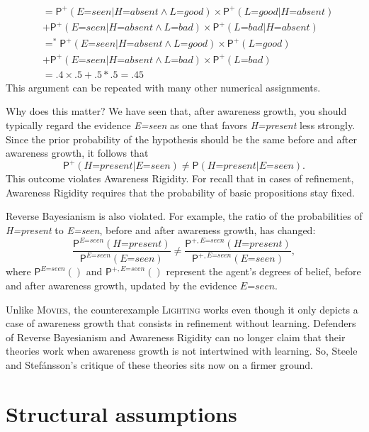 \documentclass[
  11pt,
  dvipsnames,enabledeprecatedfontcommands]{scrartcl}
\newcommand{\pr}[1]{\ensuremath{\mathsf{P}(#1)}}
\newcommand{\ppr}[2]{\ensuremath{\mathsf{P}^{#1}(#2)}}
\begin{document}
{\begin{align*}
  &= \ppr{+}{\textit{E=seen} \vert \textit{H=absent} \wedge \textit{L=good}}  \times \ppr{+}{\textit{L=good} \vert  \textit{H=absent} }\\ & +\ppr{+}{\textit{E=seen}  \vert \textit{H=absent} \wedge \textit{L=bad}} \times \ppr{+}{\textit{L=bad} \vert  \textit{H=absent}}\\
  &=^* \ppr{+}{\textit{E=seen} \vert \textit{H=absent} \wedge \textit{L=good}}  \times \ppr{+}{\textit{L=good}}\\ & +\ppr{+}{\textit{E=seen}  \vert \textit{H=absent} \wedge \textit{L=bad}} \times \ppr{+}{\textit{L=bad}}\\
  &= .4 \times .5 +.5 *.5 = .45 
  \end{align*} This argument can be repeated with many other numerical
  assignments.}

Why does this matter? We have seen that, after awareness growth, you
should typically regard the evidence \textit{E=seen} as one that favors
\textit{H=present} less strongly. Since the prior probability of the
hypothesis should be the same before and after awareness growth, it
follows that
\[\ppr{+}{\textit{H=present} \vert \textit{E=seen}} \neq \pr{\textit{H=present} \vert \textit{E=seen}}.\]
This outcome violates Awareness Rigidity. For recall that in cases of
refinement, Awareness Rigidity requires that the probability of basic
propositions stay fixed.

Reverse Bayesianism is also violated. For example, the ratio of the
probabilities of \textit{H=present} to \textit{E=seen}, before and after
awareness growth, has changed:
\[\frac{\ppr{\textit{E=seen}}{\textit{H=present}}}{\ppr{ \textit{E=seen}}{\textit{E=seen}}} \neq \frac{\ppr{+, \textit{E=seen}}{\textit{H=present}}}{\ppr{+, \textit{E=seen}}{\textit{E=seen}}},\]
where \(\ppr{\textit{E=seen}}{}\) and \(\ppr{+, \textit{E=seen}}{}\)
represent the agent's degrees of belief, before and after awareness
growth, updated by the evidence \(\textit{E=seen}\).

Unlike \textsc{Movies}, the counterexample \textsc{Lighting} works even
though it only depicts a case of awareness growth that consists in
refinement without learning. Defenders of Reverse Bayesianism and
Awareness Rigidity can no longer claim that their theories work when
awareness growth is not intertwined with learning. So, Steele and
Stefánsson's critique of these theories sits now on a firmer ground.

\hypertarget{structural-assumptions}{%
\section{Structural assumptions}\label{structural-assumptions}}
\end{document}
